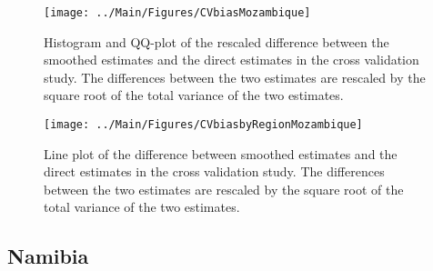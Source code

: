 \documentclass[12pt]{article}\usepackage[]{graphicx}\usepackage[]{color}
\newenvironment{knitrout}{}{} %
\begin{document}
\begin{knitrout}
\color{fgcolor}\begin{figure}[bht]

{\centering \texttt{[image: ../Main/Figures/CVbiasMozambique]} 

}

\caption[Histogram and QQ-plot of the rescaled difference between the smoothed estimates and the direct estimates in the cross validation study]{Histogram and QQ-plot of the rescaled difference between the smoothed estimates and the direct estimates in the cross validation study. The differences between the two estimates are rescaled by the square root of the total variance of the two estimates.}\label{fig:unnamed-chunk-239}
\end{figure}


\end{knitrout}

\begin{knitrout}
\color{fgcolor}\begin{figure}[bht]

{\centering \texttt{[image: ../Main/Figures/CVbiasbyRegionMozambique]} 

}

\caption[Line plot of the difference between smoothed estimates and the direct estimates in the cross validation study]{Line plot of the difference between smoothed estimates and the direct estimates in the cross validation study. The differences between the two estimates are rescaled by the square root of the total variance of the two estimates.}\label{fig:unnamed-chunk-240}
\end{figure}


\end{knitrout}


\clearpage
\subsection{Namibia}


\end{document}
